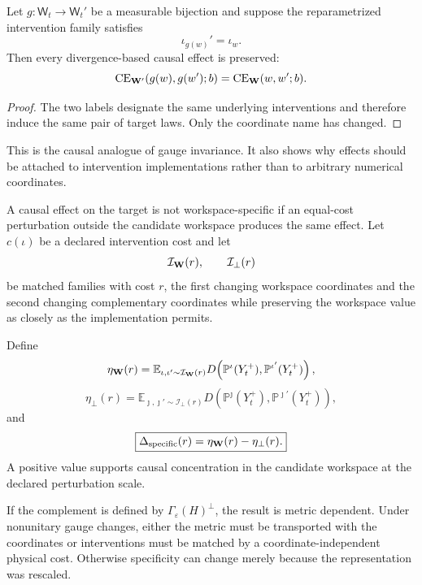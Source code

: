 \begin{proposition}
\label{prop:causal-gauge}
Let \(g:\mathsf W_t\to\mathsf W_t'\) be a measurable bijection and suppose the
reparametrized intervention family satisfies
\[
\iota_{g(w)}'=\iota_w.
\]
Then every divergence-based causal effect is preserved:
\[
\operatorname{CE}_{\mathbf W'}(g(w),g(w');b)
=
\operatorname{CE}_{\mathbf W}(w,w';b).
\]
\end{proposition}

\begin{proof}
The two labels designate the same underlying interventions and therefore induce
the same pair of target laws. Only the coordinate name has changed.
\end{proof}

This is the causal analogue of gauge invariance. It also shows why effects
should be attached to intervention implementations rather than to arbitrary
numerical coordinates.


A causal effect on the target is not workspace-specific if an equal-cost
perturbation outside the candidate workspace produces the same effect. Let
\(c(\iota)\) be a declared intervention cost and let
\[
\mathcal I_{\mathbf W}(r),
\qquad
\mathcal I_{\perp}(r)
\]
be matched families with cost \(r\), the first changing workspace coordinates
and the second changing complementary coordinates while preserving the
workspace value as closely as the implementation permits.

Define
\[
\eta_{\mathbf W}(r)
=
\mathbb E_{\iota,\iota'\sim\mathcal I_{\mathbf W}(r)}
D\!\left(
\mathbb P^{\iota}(Y_t^+),
\mathbb P^{\iota'}(Y_t^+)
\right),
\]
\[
\eta_{\perp}(r)
=
\mathbb E_{\jmath,\jmath'\sim\mathcal I_{\perp}(r)}
D\!\left(
\mathbb P^{\jmath}(Y_t^+),
\mathbb P^{\jmath'}(Y_t^+)
\right),
\]
and
\[
\boxed{
\Delta_{\mathrm{specific}}(r)
=
\eta_{\mathbf W}(r)-\eta_{\perp}(r).
}
\]
A positive value supports causal concentration in the candidate workspace at
the declared perturbation scale.

If the complement is defined by \(\Gamma_\varepsilon(H)^\perp\), the result is
metric dependent. Under nonunitary gauge changes, either the metric must be
transported with the coordinates or interventions must be matched by a
coordinate-independent physical cost. Otherwise specificity can change merely
because the representation was rescaled.


